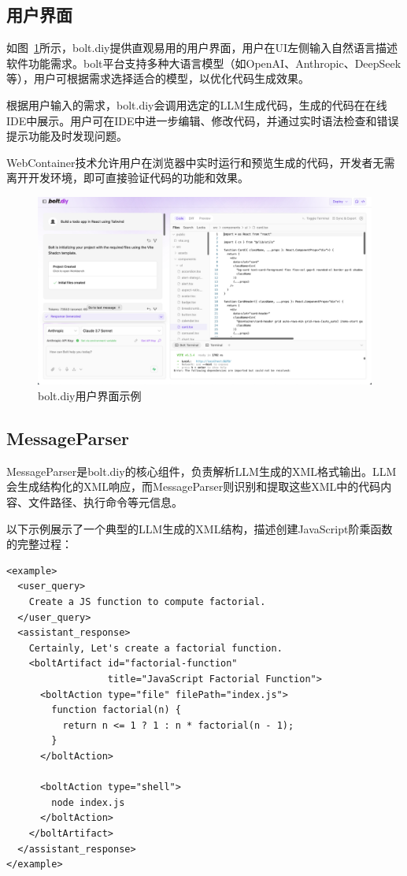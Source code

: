 
\subsection{用户界面}

如图~\ref{fig:bolt_diy_example}所示，bolt.diy提供直观易用的用户界面，用户在UI左侧输入自然语言描述软件功能需求。bolt平台支持多种大语言模型（如OpenAI、Anthropic、DeepSeek等），用户可根据需求选择适合的模型，以优化代码生成效果。

根据用户输入的需求，bolt.diy会调用选定的LLM生成代码，生成的代码在在线IDE中展示。用户可在IDE中进一步编辑、修改代码，并通过实时语法检查和错误提示功能及时发现问题。

WebContainer技术允许用户在浏览器中实时运行和预览生成的代码，开发者无需离开开发环境，即可直接验证代码的功能和效果。

\begin{figure}[H]
  \centering
  \includegraphics[width=\textwidth]{figures/bolt-diy-example.png}
  \caption{bolt.diy用户界面示例}
  \label{fig:bolt_diy_example}
\end{figure}

\subsection{MessageParser}

MessageParser是bolt.diy的核心组件，负责解析LLM生成的XML格式输出。LLM会生成结构化的XML响应，而MessageParser则识别和提取这些XML中的代码内容、文件路径、执行命令等元信息。

以下示例展示了一个典型的LLM生成的XML结构，描述创建JavaScript阶乘函数的完整过程：

\begin{verbatim}
<example>
  <user_query>
    Create a JS function to compute factorial.
  </user_query>
  <assistant_response>
    Certainly, Let's create a factorial function.
    <boltArtifact id="factorial-function" 
                  title="JavaScript Factorial Function">
      <boltAction type="file" filePath="index.js">
        function factorial(n) {
          return n <= 1 ? 1 : n * factorial(n - 1);
        }
      </boltAction>

      <boltAction type="shell">
        node index.js
      </boltAction>
    </boltArtifact>
  </assistant_response>
</example>
\end{verbatim}

